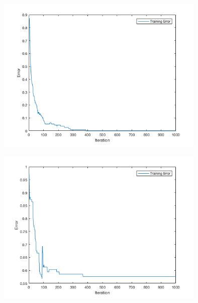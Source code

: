 \documentclass[12pt]{article}
\begin{document}


\begin{center}
  \begin{table}[H]
    \begin{varwidth}[b]{0.4\linewidth}
      \centering
      \label{table:NYYNN}
    \end{varwidth}%
    \hfill
    \begin{minipage}[b]{0.6\linewidth}
      \centering
      \includegraphics[width=100mm]{NYYNN_training_error.png}
      \label{fig:NYYNN}
    \end{minipage}
  \end{table}
\end{center}

\begin{center}
  \begin{table}[H]
    \begin{varwidth}[b]{0.4\linewidth}
      \centering
      \label{table:NYNYN}
    \end{varwidth}%
    \hfill
    \begin{minipage}[b]{0.6\linewidth}
      \centering
      \includegraphics[width=100mm]{NYNYN_training_error.png}
      \label{fig:NYNYN}
    \end{minipage}
  \end{table}
\end{center}
\end{document}
